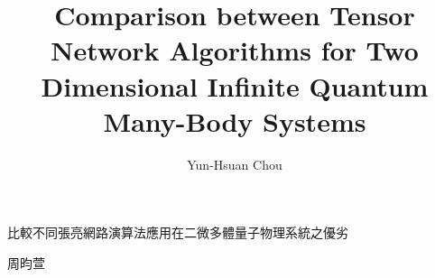 

\title{Comparison between Tensor Network Algorithms for Two Dimensional Infinite Quantum Many-Body Systems}{比較不同張亮網路演算法應用在二微多體量子物理系統之優劣}
\author{Yun-Hsuan Chou}{周昀萱}

